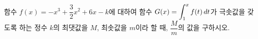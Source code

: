 함수 $f(x)=-x^3+\dfrac{3}{2}x^2+6x-k$에 대하여 함수 $G(x)=\displaystyle\int_{1}^{x}f(t)\mkern3mu dt$가 극솟값을 갖도록 하는 정수 $k$의 최댓값을 $M$, 최솟값을 $m$이라 할 때, $\dfrac{M}{m}$의 값을 구하시오.
